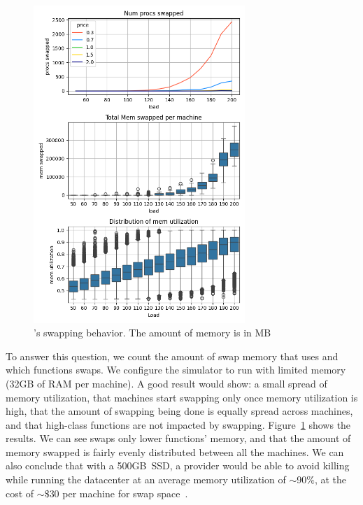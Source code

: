 \begin{figure}[t!]
    \centering
      \includegraphics[width=8cm]{img/memory_graphs.png}
      \caption{ \sys{}'s swapping behavior. The amount of memory is in MB  }
    \label{fig:memory-graphs}
\end{figure}

To answer this question, we count the amount of swap memory that \sys{}
uses and which functions \sys{} swaps. We configure the simulator to run \sys{}
with limited memory (32GB of RAM per machine). A good result would
show: a small spread of memory utilization, that machines start
swapping only once memory utilization is high, that the amount of
swapping being done is equally spread across machines, and that
high-class functions are not impacted by
swapping. Figure~\ref{fig:memory-graphs} shows the results. We can see
\sys{} swaps only lower \class{} functions' memory, and that the
amount of memory swapped is fairly evenly distributed between all the
machines. We can also conclude that with a 500GB~SSD, a provider would
be able to avoid killing while running the datacenter at an average
memory utilization of $\sim$90$\%$, at the cost of $\sim\$$30 per
machine for swap space~\cite{ssd-price}.


